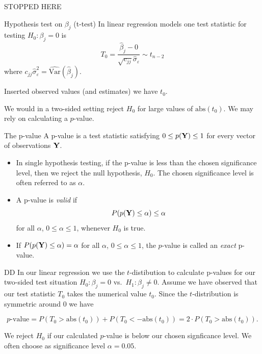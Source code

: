 \documentclass[
  ignorenonframetext,
]{beamer}
\begin{document}
\begin{frame}{STOPPED HERE}
\label{stopped-here}
\end{frame}

\begin{frame}{Hypothesis test on \(\beta_j\) (t-test)}
\label{hypothesis-test-on-beta_j-t-test}
In linear regression models one test statistic for testing
\(H_0: \beta_j=0\) is
\[T_0=\frac{\hat{\beta}_j-0}{\sqrt{c_{jj}}\hat{\sigma}_{\varepsilon}}\sim t_{n-2}\]
where
\(c_{jj}\hat{\sigma}_{\varepsilon}^2=\widehat{\text{Var}}(\hat{\beta}_j)\).

Inserted observed values (and estimates) we have \(t_0\).

We would in a two-sided setting reject \(H_0\) for large values of
\(\text{abs}(t_0)\). We may rely on calculating a \(p\)-value.
\end{frame}

\begin{frame}{The p-value}
\label{the-p-value}
A p-value is a test statistic satisfying \(0 \leq p({\bf Y}) \leq 1\)
for every vector of observations \({\bf Y}\).

\begin{itemize}
\item
  In single hypothesis testing, if the p-value is less than the chosen
  significance level, then we reject the null hypothesis, \(H_0\). The
  chosen significance level is often referred to as \(\alpha\).
\item
  A p-value is \emph{valid} if
  \[ P(p({\bf Y}) \leq \alpha) \leq \alpha\] for all \(\alpha\),
  \(0 \leq \alpha \leq 1\), whenever \(H_0\) is true.
\item
  If \(P(p({\bf Y}) \leq \alpha) = \alpha\) for all \(\alpha\),
  \(0 \leq \alpha \leq 1\), the \(p\)-value is called an \emph{exact}
  p-value.
\end{itemize}
\end{frame}

\begin{frame}{DD}
\label{dd}
In our linear regression we use the \(t\)-distibution to calculate
p-values for our two-sided test situation \(H_0: \beta_j=0\)
vs.~\(H_1: \beta_j \neq 0\). Assume we have observed that our test
statistic \(T_0\) takes the numerical value \(t_0\). Since the
\(t\)-distribution is symmetric around \(0\) we have

\[p\text{-value}=P(T_0>\text{abs}(t_0))+P(T_0<-\text{abs}(t_0))=2\cdot P(T_0>\text{abs}(t_0)).\]

We reject \(H_0\) if our calculated \(p\)-value is below our chosen
signficance level. We often choose as significance level
\(\alpha=0.05\).
\end{frame}
\end{document}
